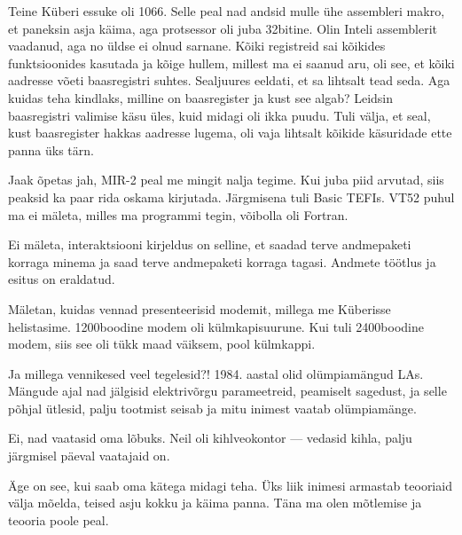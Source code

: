 Teine Küberi essuke oli 1066. Selle peal nad andsid mulle ühe
assembleri makro, et paneksin asja käima, aga protsessor oli juba 32bitine. Olin Inteli assemblerit vaadanud, aga no üldse ei olnud 
sarnane. Kõiki registreid sai kõikides funktsioonides kasutada ja kõige 
hullem, millest ma ei saanud aru, oli see, et kõiki aadresse võeti 
baasregistri suhtes. Sealjuures eeldati, et sa lihtsalt 
tead seda. Aga kuidas teha kindlaks, milline on baasregister ja kust see 
algab? Leidsin baasregistri valimise käsu üles, kuid 
midagi oli ikka puudu. Tuli välja, et seal, kust baasregister hakkas aadresse 
lugema, oli vaja lihtsalt kõikide käsuridade ette panna üks 
tärn.


Jaak õpetas jah, MIR-2 peal me mingit nalja 
tegime. Kui juba piid arvutad, siis peaksid ka paar rida oskama kirjutada. Järgmisena tuli Basic TEFIs. VT52 puhul ma ei mäleta, 
milles ma programmi tegin, võibolla oli Fortran. 


Ei mäleta, interaktsiooni kirjeldus on selline, et saadad 
terve 
andmepaketi korraga minema ja saad terve andmepaketi korraga tagasi. Andmete 
töötlus ja esitus on eraldatud. 


Mäletan, kuidas vennad presenteerisid modemit, millega me Küberisse 
helistasime. 1200boodine modem oli külmkapisuurune. Kui tuli 2400boodine modem, siis see oli tükk maad väiksem, pool külmkappi.

Ja millega vennikesed veel tegelesid?! 1984. aastal olid olümpiamängud LAs. Mängude 
ajal nad jälgisid elektrivõrgu parameetreid, peamiselt sagedust, ja selle põhjal 
ütlesid, palju tootmist seisab ja mitu inimest vaatab olümpiamänge. 


Ei, nad vaatasid oma lõbuks. Neil oli kihlveokontor --- vedasid kihla, palju järgmisel päeval 
vaatajaid on.


Äge on see, kui saab oma kätega midagi teha. Üks liik inimesi armastab teooriaid 
välja mõelda, teised asju kokku 
ja käima panna. Täna ma olen 
mõtlemise ja teooria poole peal.

